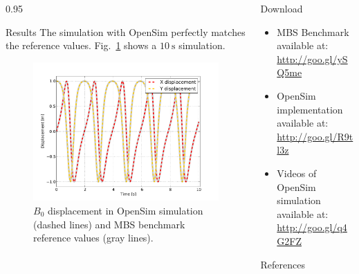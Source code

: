 \documentclass[final]{beamer}
\newlength{\onecolwid}
\newlength{\twocolwid}
\begin{document}
\begin{frame}[t]
\begin{columns}[t]
\begin{column}{\twocolwid}
\begin{columns}[t, totalwidth=\twocolwid]
\begin{column}{0.95\onecolwid}
\begin{block}{Results}
The simulation with OpenSim perfectly matches the reference values. Fig.~\ref{FIG:simulationPlot} shows a $\SI{10}{\second}$ simulation. 


\begin{figure}[h]
\centering
\includegraphics[width=0.95\onecolwid]{2MBS_PlotResults.pdf}
\caption{$B_{0}$ displacement in OpenSim simulation (dashed lines) and MBS benchmark reference values (gray lines). }
\label{FIG:simulationPlot}
\end{figure}

\end{block}

\end{column}
  

\end{columns}


\end{column}
\begin{column}{\onecolwid} %


\begin{block}{Download}
\begin{itemize}
\item MBS Benchmark available at: \url{http://goo.gl/ySQ5me}
\item OpenSim implementation available at: \url{http://goo.gl/R9tl3z}
\item Videos of OpenSim simulation available at: \url{http://goo.gl/q4G2FZ}
\end{itemize}
\end{block}
\begin{block}{References}


\end{block}
\end{column}
\end{columns}
\end{frame}
\end{document}
